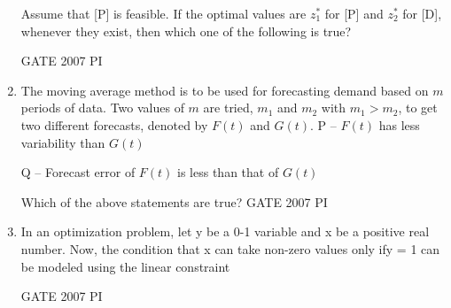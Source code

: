 \documentclass[journal,12pt,onecolumn]{IEEEtran}
\theoremstyle{remark}
\begin{document}
\begin{enumerate}
Assume that [P] is feasible. If the optimal values are $z_1^*$ for [P] and $z_2^*$ for [D], 
whenever they exist, then which one of the following is true?

\hfill{GATE 2007 PI}

\begin{enumerate}
\end{enumerate}

\item 
The moving average method is to be used for forecasting demand based on $m$ periods of data. 
Two values of $m$ are tried, $m_1$ and $m_2$ with $m_1 > m_2$, to get two different forecasts, 
denoted by $F(t)$ and $G(t)$.  
P -- $F(t)$ has less variability than $G(t)$  

Q -- Forecast error of $F(t)$ is less than that of $G(t)$  

Which of the above statements are true?
\hfill{GATE 2007 PI}
\begin{enumerate}
    \end{enumerate}
    
    \item 
In an optimization problem, let y be a 0-1 variable and x be a positive real number. Now, the condition that x can take non-zero values only ify = 1 can be modeled using the linear constraint

\hfill{GATE 2007 PI}

\begin{enumerate}
\end{enumerate}


\end{enumerate}
\end{document}
